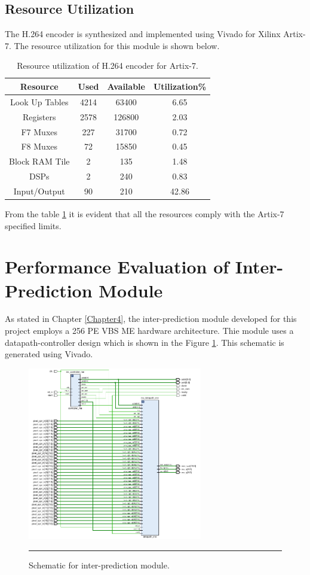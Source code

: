 \subsection{Resource Utilization}
The H.264 encoder is synthesized and implemented using Vivado for Xilinx Artix-7. The resource utilization for this module is shown below.
\begin{table}[H]
	\centering
	\begin{tabular}{|c|c|c|c|} \hline
		\textbf{Resource} & \textbf{Used} & \textbf{Available} & \textbf{Utilization\%}  \\ \hline
		Look Up Tables & 4214 & 63400 & 6.65 \\ \hline
		Registers 	  & 2578 & 126800 & 2.03 \\ \hline
		F7 Muxes      & 227 & 31700 & 0.72 \\ \hline
		F8 Muxes      & 72 & 15850 & 0.45 \\ \hline 
		Block RAM Tile & 2 & 135 & 1.48 \\ \hline
		DSPs & 2 & 240 & 0.83 \\ \hline
		Input/Output   & 90 & 210 & 42.86 \\ \hline 
	\end{tabular}
	\caption{Resource utilization of H.264 encoder for Artix-7.}
	\label{tab:resource_ec}
\end{table}
From the table \ref{tab:resource_ec} it is evident that all the resources comply with the Artix-7 specified limits. 
   
\section{Performance Evaluation of Inter-Prediction Module}
As stated in Chapter \ref{Chapter4}, the inter-prediction module developed for this project employs a 256 PE VBS ME hardware architecture. Thie module uses a datapath-controller design which is shown in the Figure \ref{fig:mehardware}. This schematic is generated using Vivado. 
\begin{figure}[H]
	\centering
	\includegraphics[width = 3in]{./Figures/mehardware.png}
	\rule{35em}{0.5pt}
	\caption{Schematic for inter-prediction module.}
	\label{fig:mehardware}
\end{figure}
